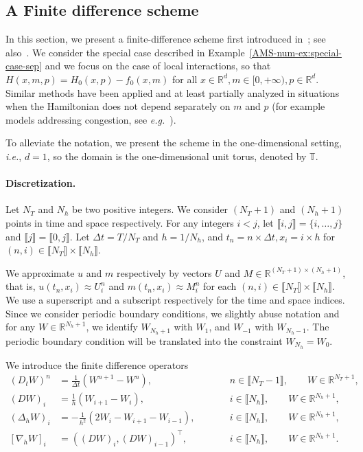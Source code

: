 \documentclass{amsproc}
\theoremstyle{definition}
\theoremstyle{remark}
\numberwithin{equation}{section}
\newcommand{\RR}{{\mathbb R}}
\newcommand{\TT}{{\mathbb T}}
\newcommand{\grad}{\nabla}
\begin{document}
\subsection{A Finite difference scheme}
\label{AMS-num-sec:fin-diff}


In this section, we present a finite-difference scheme first introduced in~\cite{MR2679575}; see also~\cite{MR3135339}. We consider the special case described in Example~\ref{AMS-num-ex:special-case-sep} and we focus on the case of local interactions, so that $H(x,m,p) = H_0(x,p) - f_0(x,m)$ for all $x \in \RR^d, m \in [0,+\infty), p \in \RR^d$. Similar methods have been  applied and at least partially analyzed in situations when the Hamiltonian does not depend separately on $m$ and $p$ (for example models addressing congestion, see \textit{e.g.}~\cite{YAJML}). 

To alleviate the notation, we present the scheme in the one-dimensional setting, \textit{i.e.}, $d=1$, so the domain is the one-dimensional unit torus, denoted by $\TT$.






\paragraph{\textbf{Discretization.} }

Let $N_T$ and $N_h$ be two positive integers. We consider $(N_T+1)$ and $(N_h+1)$ points in  time and space respectively. For any integers $i < j$, let $\llbracket i,j \rrbracket = \{i,\dots,j\}$ and $\llbracket j \rrbracket = \llbracket 0, j \rrbracket$. Let $\Delta t = T/N_T$ and $h = 1/N_h$, and $t_n = n \times \Delta t, x_i = i \times h$ for $(n,i) \in \llbracket N_T \rrbracket \times \llbracket N_h \rrbracket$. 

We approximate $u$ and $m$ respectively by vectors $U$ and $M \in \RR^{(N_T+1)\times(N_h+1)}$, that is, $u(t_n,x_i) \approx U^{n}_{i}$ and $m(t_n,x_i) \approx M^{n}_{i}$ for each $(n,i) \in \llbracket N_T \rrbracket \times \llbracket N_h \rrbracket$. We use a superscript and a subscript respectively for the time and space indices. Since we consider periodic boundary conditions, we slightly abuse notation and for any $W \in \RR^{N_h+1}$, we identify $W_{N_h+1}$ with $W_1$, and $W_{-1}$ with $W_{N_h-1}$. The periodic boundary condition will be translated into the constraint $W_{N_h} = W_0$. 


We introduce the finite difference operators
\begin{align*}
	(D_t W)^n &= \frac{1}{\Delta t}(W^{n+1} - W^n), \qquad &&n \in \llbracket N_T-1 \rrbracket, \qquad W \in \RR^{N_T+1},
	\\
	(D W)_i &= \frac{1}{h} (W_{i+1} - W_{i}), \qquad &&i  \in \llbracket N_h \rrbracket, \qquad W \in \RR^{N_h+1},
	\\
	(\Delta_h W)_i &= -\frac{1}{h^2} \left(2 W_i - W_{i+1} - W_{i-1}\right), \qquad &&i \in \llbracket N_h \rrbracket, \qquad W \in \RR^{N_h+1},
	\\
	[\grad_h W]_i &= \left( (D W)_{i}, (D W)_{i-1} \right)^\top, \qquad &&i \in \llbracket N_h \rrbracket, \qquad W \in \RR^{N_h+1}.
\end{align*}
\end{document}

